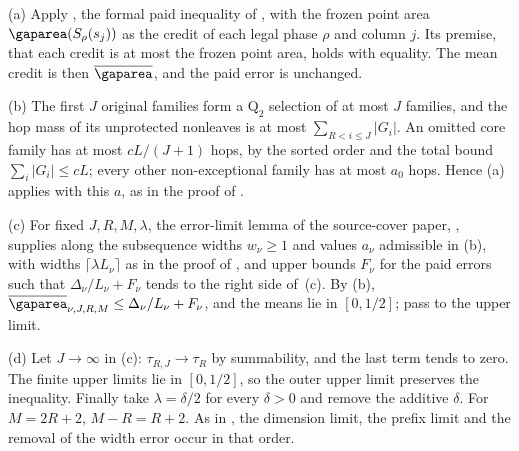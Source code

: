 \begin{outline}
(a) Apply , the formal paid inequality
of \cite[Theorem~3.5]{SourceCovers2026}, with the frozen point area
$\gaparea(S_\rho(s_j))$ as the credit of each legal phase $\rho$ and column $j$. Its
premise, that each credit is at most the frozen point area, holds with equality. The
mean credit is then $\meanarea$, and the paid error is unchanged.

(b) The first $J$ original families form a $\mathrm Q_2$ selection of at most $J$
families, and the hop mass of its unprotected nonleaves is at most
$\sum_{R<i\le J}|G_i|$. An omitted core family has at most $cL/(J+1)$ hops, by the
sorted order and the total bound $\sum_i|G_i|\le cL$; every other non-exceptional
family has at most $a_0$ hops. Hence (a) applies with this $a$, as in the proof of
\cite[Theorem~4.2]{SourceCovers2026}.

(c) For fixed $J,R,M,\lambda$, the error-limit lemma of the source-cover paper,
, supplies along
the subsequence widths $w_\nu\ge1$ and values $a_\nu$ admissible in (b), with widths
$\lceil\lambda L_\nu\rceil$ as in the proof of \cite[Theorem~4.2]{SourceCovers2026},
and upper bounds $F_\nu$ for the paid errors such that $\Delta_\nu/L_\nu+F_\nu$ tends
to the right side of~(c). By (b), $\meanarea_{\nu,J,R,M}\le\Delta_\nu/L_\nu+F_\nu$, and
the means lie in $[0,1/2]$; pass to the upper limit.

(d) Let $J\to\infty$ in (c): $\tau_{R,J}\to\tau_R$ by summability, and the last term
tends to zero. The finite upper limits lie in $[0,1/2]$, so the outer upper limit
preserves the inequality. Finally take $\lambda=\delta/2$ for every $\delta>0$ and
remove the additive $\delta$. For $M=2R+2$, $M-R=R+2$. As in
\cite[Theorem~4.6]{SourceCovers2026}, the dimension limit, the prefix limit and the
removal of the width error occur in that order.
\end{outline}

